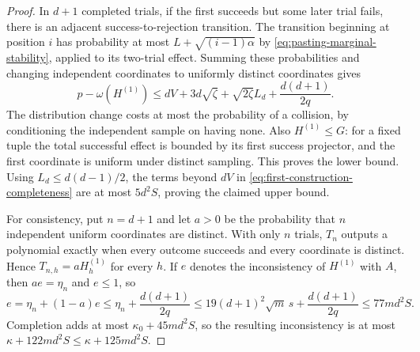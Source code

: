 \documentclass[11pt]{article}
\theoremstyle{definition}
\begin{document}
\begin{proof}
In $d+1$ completed trials, if the first succeeds but some later
trial fails, there is an adjacent success-to-rejection transition.
The transition beginning at position $i$ has probability at most
$L+\sqrt{(i-1)\alpha}$ by
\eqref{eq:pasting-marginal-stability}, applied to its two-trial effect.
Summing these probabilities and changing independent coordinates to
uniformly distinct coordinates gives
\begin{equation}\label{eq:first-construction-completeness}
 p-\omega(H^{(1)})\leq
 dV+3d\sqrt\zeta+\sqrt{2\zeta}L_d
       +\frac{d(d+1)}{2q}.
\end{equation}
The distribution change costs at most the probability of a collision,
by conditioning the independent sample on having none.
Also $H^{(1)}\leq G$: for a fixed tuple the total successful effect
is bounded by its first success projector, and the first coordinate
is uniform under distinct sampling.  This proves the lower bound.
Using $L_d\leq d(d-1)/2$, the terms beyond $dV$ in
\eqref{eq:first-construction-completeness} are at most $5d^2S$,
proving the claimed upper bound.

For consistency, put $n=d+1$ and let $a>0$ be the probability that
$n$ independent uniform coordinates are distinct.  With only $n$
trials, $T_n$ outputs a polynomial exactly when every outcome
succeeds and every coordinate is distinct.  Hence
$T_{n,h}=aH_h^{(1)}$ for every $h$.  If $e$ denotes the
inconsistency of $H^{(1)}$ with $A$, then $ae=\eta_n$ and $e\leq1$,
so
\[
 e=\eta_n+(1-a)e
 \leq\eta_n+\frac{d(d+1)}{2q}
 \leq19(d+1)^2\sqrt m\,s+\frac{d(d+1)}{2q}
 \leq77md^2S.
\]
Completion adds at most $\kappa_0+45md^2S$, so the resulting
inconsistency is at most $\kappa+122md^2S\leq\kappa+125md^2S$.
\end{proof}
\end{document}
